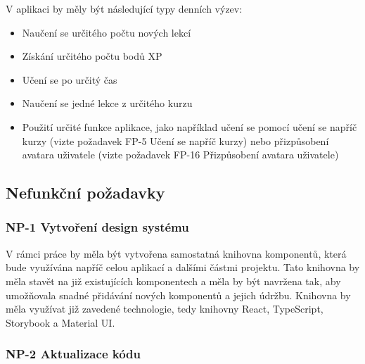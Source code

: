 V aplikaci by měly být následující typy denních výzev:
\begin{itemize}
    \item Naučení se určitého počtu nových lekcí
    \item Získání určitého počtu bodů XP
    \item Učení se po určitý čas
    \item Naučení se jedné lekce z určitého kurzu
    \item Použití určité funkce aplikace, jako například učení se pomocí učení se napříč kurzy (vizte požadavek FP-5 Učení se napříč kurzy) %
    nebo přizpůsobení avatara uživatele (vizte požadavek FP-16 Přizpůsobení avatara uživatele) %
\end{itemize}

\subsection{Nefunkční požadavky}

\subsubsection{NP-1 Vytvoření design systému}


V rámci práce by měla být vytvořena samostatná knihovna komponentů, která bude využívána napříč celou aplikací a dalšími částmi projektu. Tato knihovna by měla stavět na již existujících komponentech a měla by být navržena tak, aby umožňovala snadné přidávání nových komponentů a jejich údržbu. Knihovna by měla využívat již zavedené technologie, tedy knihovny React, TypeScript, Storybook a Material UI.



\subsubsection{NP-2 Aktualizace kódu}


